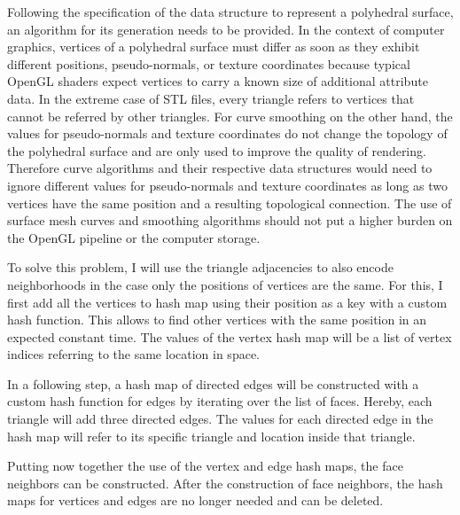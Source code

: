 \documentclass{stdlocal}
\begin{document}
  Following the specification of the data structure to represent a polyhedral surface, an algorithm for its generation needs to be provided.
  In the context of computer graphics, vertices of a polyhedral surface must differ as soon as they exhibit different positions, pseudo-normals, or texture coordinates because typical OpenGL shaders expect vertices to carry a known size of additional attribute data.
  In the extreme case of STL files, every triangle refers to vertices that cannot be referred by other triangles.
  For curve smoothing on the other hand, the values for pseudo-normals and texture coordinates do not change the topology of the polyhedral surface and are only used to improve the quality of rendering.
  Therefore curve algorithms and their respective data structures would need to ignore different values for pseudo-normals and texture coordinates as long as two vertices have the same position and a resulting topological connection.
  The use of surface mesh curves and smoothing algorithms should not put a higher burden on the OpenGL pipeline or the computer storage.

  To solve this problem, I will use the triangle adjacencies to also encode neighborhoods in the case only the positions of vertices are the same.
  For this, I first add all the vertices to hash map using their position as a key with a custom hash function.
  This allows to find other vertices with the same position in an expected constant time.
  The values of the vertex hash map will be a list of vertex indices referring to the same location in space.

  In a following step, a hash map of directed edges will be constructed with a custom hash function for edges by iterating over the list of faces.
  Hereby, each triangle will add three directed edges.
  The values for each directed edge in the hash map will refer to its specific triangle and location inside that triangle.

  Putting now together the use of the vertex and edge hash maps, the face neighbors can be constructed.
  After the construction of face neighbors, the hash maps for vertices and edges are no longer needed and can be deleted.
\end{document}
